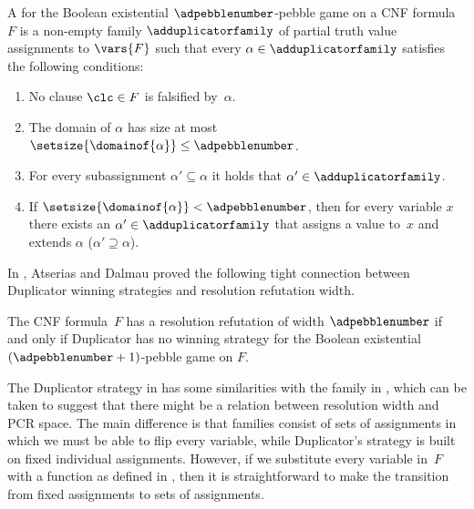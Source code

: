 \documentclass{toc}
\begin{document}
\begin{definition}
  \label{def:AD-game}  
%
%
%
%
%
%
%
%
  A
  for the Boolean existential $\adpebblenumber$-pebble game on 
  a CNF formula~$F$ is a non-empty family $\adduplicatorfamily$ of
  partial truth value assignments 
%
  to $\vars{F}$
  such that every 
  $\alpha \in \adduplicatorfamily$ 
  satisfies the following conditions:
  \begin{enumerate}
  \item
    No clause $\clc \in F$ is falsified by~$\alpha$.
  \item
    The domain of $\alpha$ has size at most
    $\setsize{\domainof{\alpha}} \leq \adpebblenumber$.
  \item 
    For every 
    subassignment
    $\alpha' \subseteq \alpha$ 
    it holds that
    $\alpha' \in \adduplicatorfamily$.
%
%
%
%
  \item 
    If $\setsize{\domainof{\alpha}} < \adpebblenumber$, then for every
    variable $x$ there exists an $\alpha' \in \adduplicatorfamily$ 
    that assigns a value to~$x$
    and extends $\alpha$ 
    (\ieComma $\alpha' \supseteq \alpha$).
%
%
%
%
  \end{enumerate}
\end{definition}

In \cite{AD08CombinatoricalCharacterization}, Atserias and Dalmau
proved the following tight connection between Duplicator winning strategies 
and resolution refutation width.
%
%

\begin{theorem}
  \label{th:ADWidthCharacterization}
%
%
%
  The CNF formula~$F$ has a resolution refutation of width
  $\adpebblenumber$ if and only if Duplicator has no winning strategy
  for the Boolean existential $(\adpebblenumber + 1)$-pebble game on $F$.
\end{theorem}

%
%
%
%
%
%
%
%
%
%
%
%
%
%
%
%

The Duplicator strategy in  has some similarities
with the \kextendibleNok{} family in , which
can be taken to suggest that there might be a relation between
resolution width and PCR space. The main difference is that
\kextendibleNok families consist of sets of assignments in
which we must be able to flip every variable, while Duplicator's
strategy is built on fixed individual assignments. However,
if we substitute every variable in~$F$ with a \nonauthor{} function as
defined in , then it is straightforward to
make the transition from fixed assignments to sets of \flippable assignments.
%
%
%
%
%
%
%
\end{document}

